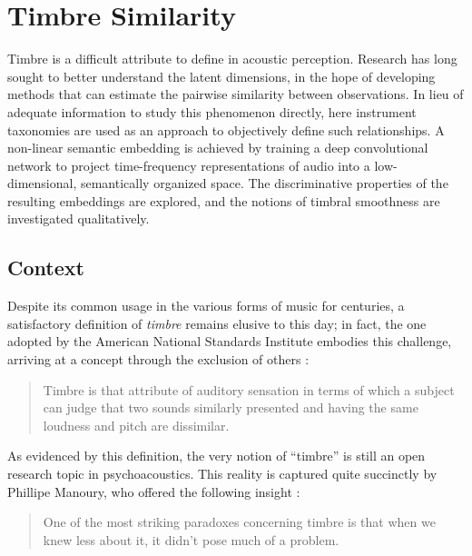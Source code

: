 
\graphicspath{{4/figures/}}

\chapter{Timbre Similarity}
\label{chp:timbre}

Timbre is a difficult attribute to define in acoustic perception.
Research has long sought to better understand the latent dimensions, in the hope of developing methods that can estimate the pairwise similarity between observations.
In lieu of adequate information to study this phenomenon directly, here instrument taxonomies are used as an approach to objectively define such relationships.
A non-linear semantic embedding is achieved by training a deep convolutional network to project time-frequency representations of audio into a low-dimensional, semantically organized space.
The discriminative properties of the resulting embeddings are explored, and the notions of timbral smoothness are investigated qualitatively.


\section{Context}
\label{sec:context}

Despite its common usage in the various forms of music for centuries, a satisfactory definition of \emph{timbre} remains elusive to this day; in fact, the one adopted by the American National Standards Institute embodies this challenge, arriving at a concept through the exclusion of others \cite{ANSI197x}:

\begin{quote}
Timbre is that attribute of auditory sensation in terms of which a subject can judge that two sounds similarly presented and having the same loudness and pitch are dissimilar.
\end{quote}

As evidenced by this definition, the very notion of ``timbre'' is still an open research topic in psychoacoustics.
This reality is captured quite succinctly by Phillipe Manoury, who offered the following insight \cite{}:

\begin{quote}
One of the most striking paradoxes concerning timbre is that when we knew less about it, it didn’t pose much of a problem.
\end{quote}

